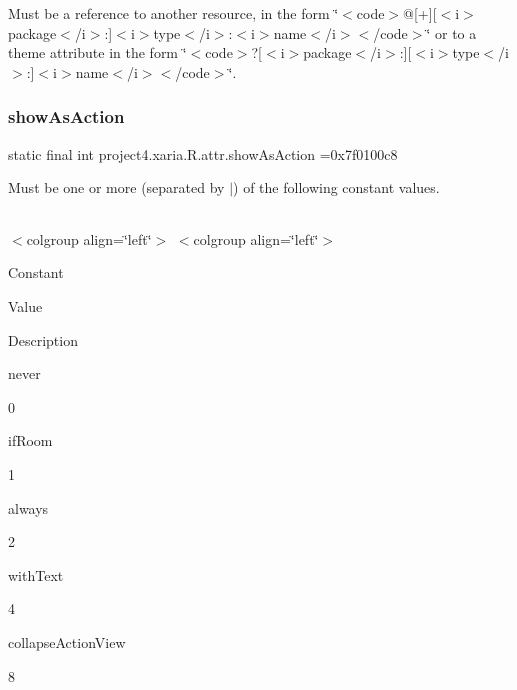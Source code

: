 Must be a reference to another resource, in the form \char`\"{}$<$code$>$@\mbox{[}+\mbox{]}\mbox{[}$<$i$>$package$<$/i$>$\+:\mbox{]}$<$i$>$type$<$/i$>$\+:$<$i$>$name$<$/i$>$$<$/code$>$\char`\"{} or to a theme attribute in the form \char`\"{}$<$code$>$?\mbox{[}$<$i$>$package$<$/i$>$\+:\mbox{]}\mbox{[}$<$i$>$type$<$/i$>$\+:\mbox{]}$<$i$>$name$<$/i$>$$<$/code$>$\char`\"{}. \mbox{\label{classproject4_1_1xaria_1_1R_1_1attr_a677f8c338feb479fa489e4c40325f0f5}} 
\subsubsection{\texorpdfstring{show\+As\+Action}{showAsAction}}
{\footnotesize\ttfamily static final int project4.\+xaria.\+R.\+attr.\+show\+As\+Action =0x7f0100c8\hspace{0.3cm}{\ttfamily [static]}}

Must be one or more (separated by \textquotesingle{}$\vert$\textquotesingle{}) of the following constant values.

\tabulinesep=1mm
\begin{longtabu} spread 0pt [c]{*{0}{|X[-1]}|}
\hline
\end{longtabu}
$<$colgroup align=\char`\"{}left\char`\"{}$>$ $<$colgroup align=\char`\"{}left\char`\"{}$>$ 

Constant

Value

Description 

{\ttfamily never}

0

{\ttfamily if\+Room}

1

{\ttfamily always}

2

{\ttfamily with\+Text}

4

{\ttfamily collapse\+Action\+View}

8\mbox{\label{classproject4_1_1xaria_1_1R_1_1attr_a94ea924a465e7254ff8282d55bae560e}} 
